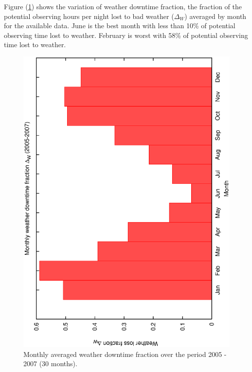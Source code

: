 {{Figure (\ref{fig:ecs_monthly_weather_stats}) shows the variation of weather downtime fraction, the fraction of the potential observing hours per night lost to bad weather ($\Delta_W$) averaged by month for the available data. June is the best month with less than 10\% of potential observing time lost to weather. February is worst with 58\% of potential observing time lost to weather.


\begin{figure}[htbp]
\begin{center}
    \includegraphics[scale=0.4, angle=-90]{figures/ecs/monthly_weather_stats.eps}
\end{center}   
\caption[Monthly averaged weather downtime fraction.]
{Monthly averaged weather downtime fraction over the period 2005 - 2007 (30 months).}
 \label{fig:ecs_monthly_weather_stats}
\end{figure}


}}
